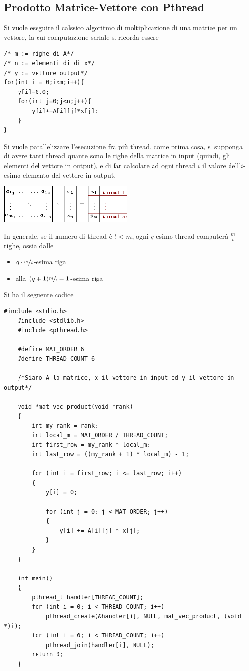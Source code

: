 \documentclass[10pt, letterpaper]{report}
\begin{document}
\subsection{Prodotto Matrice-Vettore con Pthread}
Si vuole eseguire il calssico algoritmo di moltiplicazione di una matrice per un vettore, la cui 
computazione seriale si ricorda essere
\begin{lstlisting}[style=CStyle]
/* m := righe di A*/
/* n := elementi di di x*/
/* y := vettore output*/
for(int i = 0;i<m;i++){
    y[i]=0.0;
    for(int j=0;j<n;j++){
        y[i]+=A[i][j]*x[j];
    }
}
\end{lstlisting}
Si vuole parallelizzare l'esecuzione fra più thread, come prima cosa, si supponga di avere tanti thread 
quante sono le righe della matrice in input (quindi, gli elementi del vettore in output), e di far calcolare 
ad ogni thread $i$ il valore dell'$i$-esimo elemento del vettore in output.\begin{center}
    \includegraphics[width=0.5\textwidth]{images/threadMatProd.eps}
\end{center} 
In generale, se il numero di thread è $t<m$, ogni $q$-esimo thread computerà $\frac{m}{t}$ righe, ossia dalle \begin{itemize}
    \item \color{teal}$q\cdot\nicefrac{m}{t}$\color{black}-esima riga 
    \item alla \color{teal}$(q+1)\nicefrac{m}{t}-1$\color{black}-esima riga
\end{itemize}
Si ha il seguente codice
\begin{lstlisting}[style=CStyle]
    #include <stdio.h>
    #include <stdlib.h>
    #include <pthread.h>
    
    #define MAT_ORDER 6
    #define THREAD_COUNT 6
    
    /*Siano A la matrice, x il vettore in input ed y il vettore in output*/
    
    void *mat_vec_product(void *rank)
    {
        int my_rank = rank;
        int local_m = MAT_ORDER / THREAD_COUNT;
        int first_row = my_rank * local_m;
        int last_row = ((my_rank + 1) * local_m) - 1;
    
        for (int i = first_row; i <= last_row; i++)
        {
            y[i] = 0;
    
            for (int j = 0; j < MAT_ORDER; j++)
            {
                y[i] += A[i][j] * x[j];
            }
        }
    }
    
    int main()
    {
        pthread_t handler[THREAD_COUNT];
        for (int i = 0; i < THREAD_COUNT; i++)
            pthread_create(&handler[i], NULL, mat_vec_product, (void *)i);
        for (int i = 0; i < THREAD_COUNT; i++)
            pthread_join(handler[i], NULL);
        return 0;
    }
\end{lstlisting}\flowerLine 
\end{document}
